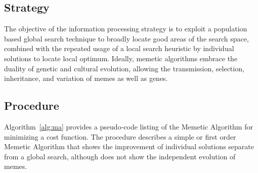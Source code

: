 \subsection{Strategy}
The objective of the information processing strategy is to exploit a population based global search technique to broadly locate good areas of the search space, combined with the repeated usage of a local search heuristic by individual solutions to locate local optimum.
Ideally, memetic algorithms embrace the duality of genetic and cultural evolution, allowing the transmission, selection, inheritance, and variation of memes as well as genes.

\subsection{Procedure}
Algorithm~\ref{alg:ma} provides a pseudo-code listing of the Memetic Algorithm for minimizing a cost function. The procedure describes a simple or first order Memetic Algorithm that shows the improvement of individual solutions separate from a global search, although does not show the independent evolution of memes. 

